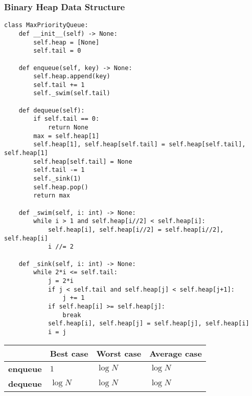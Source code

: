 \documentclass[a4paper]{article}
\begin{document}
\subsubsection*{Binary Heap Data Structure}
\begin{lstlisting}
class MaxPriorityQueue:
    def __init__(self) -> None:
        self.heap = [None]
        self.tail = 0

    def enqueue(self, key) -> None:
        self.heap.append(key)
        self.tail += 1
        self._swim(self.tail)

    def dequeue(self):
        if self.tail == 0:
            return None
        max = self.heap[1]
        self.heap[1], self.heap[self.tail] = self.heap[self.tail], self.heap[1]
        self.heap[self.tail] = None
        self.tail -= 1
        self._sink(1)
        self.heap.pop()
        return max

    def _swim(self, i: int) -> None:
        while i > 1 and self.heap[i//2] < self.heap[i]:
            self.heap[i], self.heap[i//2] = self.heap[i//2], self.heap[i]
            i //= 2

    def _sink(self, i: int) -> None:
        while 2*i <= self.tail:
            j = 2*i
            if j < self.tail and self.heap[j] < self.heap[j+1]:
                j += 1
            if self.heap[i] >= self.heap[j]:
                break
            self.heap[i], self.heap[j] = self.heap[j], self.heap[i]
            i = j
\end{lstlisting}
\begin{spacing}{1.5}
\begin{tabularx}{1\textwidth}{|p{}|X|X|X|}
    \hline
    &\textbf{Best case} & \textbf{Worst case} & \textbf{Average case}\\
    \hline
    \textbf{enqueue}&$1$&$\log N$&$\log N$\\
    \hline
    \textbf{dequeue}&$\log N$&$\log N$&$\log N$\\
    \hline
\end{tabularx}
\end{spacing}
\end{document}
